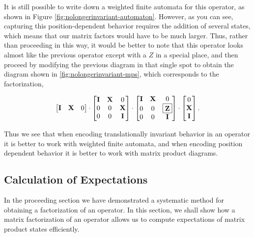 \documentclass[12pt]{amsbook}
\theoremstyle{plain}
\theoremstyle{definition}
\theoremstyle{remark}
\begin{document}
It is still possible to write down a weighted finite automata for this operator, as shown in Figure \ref{fig:nolongerinvariant-automaton}.  However, as you can see, capturing this position-dependent behavior requires the addition of several states, which means that our matrix factors would have to be much larger.  Thus, rather than proceeding in this way, it would be better to note that this operator looks almost like the previous operator except with a $Z$ in a special place, and then proceed by modifying the previous diagram in that single spot to obtain the diagram shown in \ref{fig:nolongerinvariant-mps}, which corresponds to the factorization,

$$
\begin{bmatrix}
\textbf{I} & \textbf{X} & 0 \\
\end{bmatrix}
\cdot
\begin{bmatrix}
\textbf{I} & \textbf{X} & 0 \\
0 & 0 & \textbf{X} \\
0 & 0 & \textbf{I} \\
\end{bmatrix}
\cdot
\begin{bmatrix}
\textbf{I} & \textbf{X} & 0 \\
0 & 0 & \fbox{\textbf{Z}} \\
0 & 0 & \textbf{I} \\
\end{bmatrix}
\cdot
\begin{bmatrix}
0 \\
\textbf{X} \\
\textbf{I} \\
\end{bmatrix}.
$$

Thus we see that when encoding translationally invariant behavior in an operator it is better to work with weighted finite automata, and when encoding position dependent behavior it is better to work with matrix product diagrams.
\subsection{Calculation of Expectations}

\label{calcexp}

In the proceeding section we have demonstrated a systematic method for obtaining a factorization of an operator.  In this section, we shall show how a matrix factorization of an operator allows us to compute expectations of matrix product states efficiently.
\end{document}

